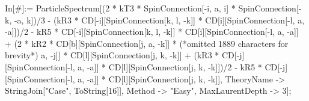 In[\#]:= ParticleSpectrum[(2 * kT3 * SpinConnection[-i, a, i] * SpinConnection[-k, -a, k])/3 - (kR3 * CD[-i][SpinConnection[k, l, -k]] * CD[i][SpinConnection[-l, a, -a]])/2 - kR5 * CD[-i][SpinConnection[k, l, -k]] * CD[i][SpinConnection[-l, a, -a]] + (2 * kR2 * CD[b][SpinConnection[j, a, -k]] * (*omitted 1889 characters for brevity*) a, -j]] * CD[l][SpinConnection[j, k, -k]] + (kR3 * CD[-j][SpinConnection[-l, a, -a]] * CD[l][SpinConnection[j, k, -k]])/2 - kR5 * CD[-j][SpinConnection[-l, a, -a]] * CD[l][SpinConnection[j, k, -k]], TheoryName -> StringJoin["Case", ToString[16]], Method -> "Easy", MaxLaurentDepth -> 3];